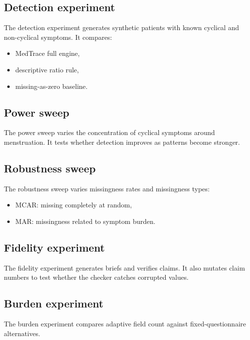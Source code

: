 \documentclass[11pt,a4paper]{article}
\begin{document}
\subsection{Detection experiment}

The detection experiment generates synthetic patients with known cyclical and non-cyclical symptoms. It compares:

\begin{itemize}
  \item MedTrace full engine,
  \item descriptive ratio rule,
  \item missing-as-zero baseline.
\end{itemize}

\subsection{Power sweep}

The power sweep varies the concentration of cyclical symptoms around menstruation. It tests whether detection improves as patterns become stronger.

\subsection{Robustness sweep}

The robustness sweep varies missingness rates and missingness types:

\begin{itemize}
  \item MCAR: missing completely at random,
  \item MAR: missingness related to symptom burden.
\end{itemize}

\subsection{Fidelity experiment}

The fidelity experiment generates briefs and verifies claims. It also mutates claim numbers to test whether the checker catches corrupted values.

\subsection{Burden experiment}

The burden experiment compares adaptive field count against fixed-questionnaire alternatives.
\end{document}
